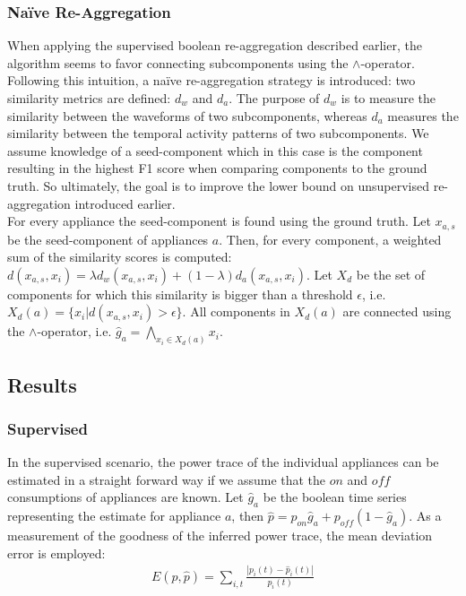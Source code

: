  \subsubsection{Na\"ive Re-Aggregation}
 When applying the supervised boolean re-aggregation described earlier, the algorithm seems to favor connecting subcomponents using the $\land$-operator. Following this intuition, a na\"ive re-aggregation strategy is introduced: two similarity metrics are defined: $d_w$ and $d_a$. The purpose of $d_w$ is to measure the similarity between the waveforms of two subcomponents, whereas $d_a$ measures the similarity between the temporal activity patterns of two subcomponents. We assume knowledge of a seed-component which in this case is the component resulting in the highest F1 score when comparing components to the ground truth. So ultimately, the goal is to improve the lower bound on unsupervised re-aggregation introduced earlier.\\
 For every appliance the seed-component is found using the ground truth. Let $x_{a,s}$ be the seed-component of appliances $a$. Then, for every component, a weighted sum of the similarity scores is computed: $d(x_{a,s}, x_i) = \lambda d_w(x_{a,s}, x_i) + (1-\lambda) d_a(x_{a,s}, x_i)$. Let $X_d$ be the set of components for which this similarity is bigger than a threshold $\epsilon$, i.e. $X_d(a) = \{x_i | d(x_{a,s}, x_i) > \epsilon\}$. All components in $X_d(a)$ are connected using the $\land$-operator, i.e. $\hat{g}_a = \bigwedge_{x_i \in X_d(a)} x_i$.
 
 \subsection{Results}
 \subsubsection{Supervised}
 In the supervised scenario, the power trace of the individual appliances can be estimated in a straight forward way if we assume that the $on$ and $off$ consumptions of appliances are known. Let $\hat{g}_a$ be the boolean time series representing the estimate for appliance $a$, then $\hat{p} = p_{on} \hat{g}_a  + p_{off}(1-\hat{g}_a)$. As a measurement of the goodness of the inferred power trace, the mean deviation error is employed: \begin{align*}
E(p, \hat{p}) = \sum_{i,t} \frac{|p_i(t) - \hat{p}_i(t)|}{p_i(t)}
\end{align*}

